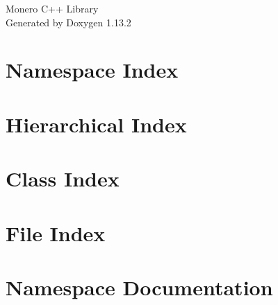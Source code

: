 \documentclass[twoside]{book}
\newcommand{\+}{\discretionary{\mbox{\scriptsize$\hookleftarrow$}}{}{}}
\newcommand{\clearemptydoublepage}{%
    \newpage{\pagestyle{empty}\cleardoublepage}%
  }
\begin{document}
  \raggedbottom
    \hypersetup{pageanchor=false,
                bookmarksnumbered=true,
                pdfencoding=unicode
               }
  \begin{titlepage}
  \vspace*{7cm}
  \begin{center}%
  {\Large Monero C++ Library}\\
  \vspace*{1cm}
  {\large Generated by Doxygen 1.13.2}\\
  \end{center}
  \end{titlepage}
  \clearemptydoublepage
  \tableofcontents
  \clearemptydoublepage
  \hypersetup{pageanchor=true}
\chapter{Namespace Index}

\chapter{Hierarchical Index}

\chapter{Class Index}

\chapter{File Index}

\chapter{Namespace Documentation}



\end{document}
